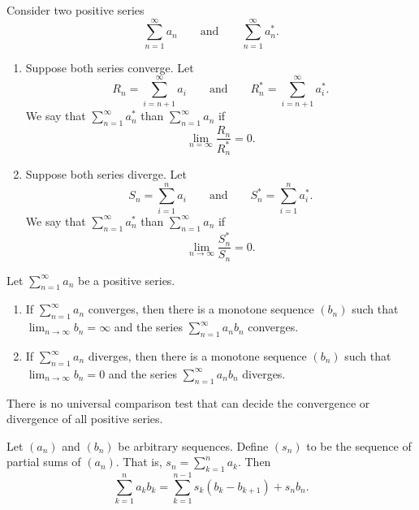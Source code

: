 \begin{definition}
  Consider two positive series
  \[ \sum_{n = 1}^{\infty} a_n \qquad \text{and} \qquad \sum_{n =
  1}^{\infty} a_n^\ast. \]
  \begin{enumerate}
    \item Suppose both series converge. Let
      \[ R_n = \sum_{i = n + 1}^{\infty} a_i \qquad \text{and} \qquad
      R_n^\ast = \sum_{i = n + 1}^{\infty} a_i^\ast. \]
      We say that $\sum_{n = 1}^{\infty} a_n^\ast$  than $\sum_{n = 1}^{\infty} a_n$ if
      \[ \lim_{n = \infty} \frac{R_n}{R_n^\ast} = 0. \]
    \item Suppose both series diverge. Let
      \[ S_n = \sum_{i = 1}^{n} a_i \qquad \text{and} \qquad S_n^\ast
      = \sum_{i = 1}^{n} a_i^\ast. \]
      We say that $\sum_{n = 1}^{\infty} a_n^\ast$  than $\sum_{n = 1}^{\infty} a_n$ if
      \[ \lim_{n \to \infty} \frac{S_n^\ast}{S_n} = 0. \]
  \end{enumerate}
\end{definition}

\begin{lemma}
  Let $\sum_{n = 1}^{\infty} a_n$ be a positive series.
  \begin{enumerate}
    \item If $\sum_{n = 1}^{\infty} a_n$ converges, then there is a
      monotone sequence $(b_n)$ such that \\
      $\lim_{n \to \infty} b_n = \infty$ and the series $\sum_{n =
      1}^{\infty} a_n b_n$ converges.
    \item If $\sum_{n = 1}^{\infty} a_n$ diverges, then there is a
      monotone sequence $(b_n)$ such that \\
      $\lim_{n \to \infty} b_n = 0$ and the series $\sum_{n =
      1}^{\infty} a_n b_n$ diverges.
  \end{enumerate}
\end{lemma}

\begin{theorem}
  There is no universal comparison test that can decide the
  convergence or divergence of all positive series.
\end{theorem}

\begin{theorem}
  Let $(a_n)$ and $(b_n)$ be arbitrary sequences. Define $(s_n)$ to
  be the sequence of partial sums of $(a_n)$. That is, $s_n = \sum_{k
  = 1}^{n} a_k$. Then
  \[ \sum_{k = 1}^{n} a_k b_k = \sum_{k = 1}^{n - 1} s_k (b_k - b_{k
  + 1}) + s_n b_n. \]
\end{theorem}

